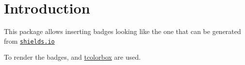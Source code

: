\section{Introduction}


This package allows inserting badges looking like the one that can be generated from \href{https://shields.io/}{\texttt{shields.io}}

To render the badges, \href{https://www.ctan.org/pkg/pgf}{\TikZ{}} and \href{https://www.ctan.org/pkg/tcolorbox}{\textsf{tcolorbox}} are used.

